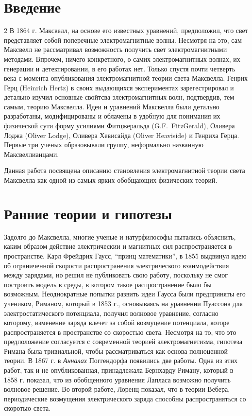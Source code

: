 \documentclass[12pt, oneside, a4paper]{article}
\begin{document}
\section*{Введение}2
В 1864 г. Максвелл, на основе его известных уравнений, предположил, что свет представляет собой поперечные электромагнитные волны. Несмотря на это, сам Максвелл не рассматривал возможность получить свет электромагнитными методами. Впрочем, ничего конкретного, о самих электромагнитных волнах, их генерации и детектировании, в его работах нет. Только спустя почти четверть века с момента опубликования электромагнитной теории света Максвелла, Генрих Герц (Heinrich Hertz) в своих выдающихся  экспериментах зарегестрировал и детально изучил основные свойтсва электромагнитных волн, подтвердив, тем самым, теорию Максвелла. Идеи и уравнений  Максвелла были детально разработаны, модифицированы и облачены в удобную для понимания их физической сути форму усилиями Фитцжеральда (G.F.~FitzGerald), Оливера Лоджа (Oliver Lodge), Оливера Хевисайда (Oliver Heaviside) и Генриха Герца. Первые три ученых образовывали группу, неформально названную Максвеллианцами. 

Данная работа посвящена описанию становления электромагнитной теории света Максвелла как одной из самых ярких обобщающих физических теорий.
\section*{Ранние теории и гипотезы}
Задолго до Максвелла, многие ученые и натурфилософы пытались объяснить, каким образом действие электрическии и магнитных  сил распространяется в пространстве. Карл Фрейдрих Гаусс, ``принц математики'', в 1855 выдвинул идею об ограниченной скорости распространения электрического взаимодействия между зарядами, но решил не публиковать свою работу, поскольку не смог построить модель в среды, в котором такое распространение было бы возможным. Неоднократные попытки развить идеи Гаусса были предприняты его учеником, Риманом, который в 1853 г., основываясь на уравнении Пуассона для электростатического потенциала, получил волновое уравнение, согласно которому, изменение заряда влечет за собой возмуцение потенциала, которе распространяется в пространстве со скоростью света. Несмотря на то, что это предположение согласуется с современной теорией электромагнетизма, гипотеза Римана была тривиальной, чтобы рассматриваться как основа полноценной теории. В 1867 г. в \emph{Анналах} Поггендорфа появились две работы. Одна из этих работ, так и не опубликованная, принадлежала Бернхарду Риману, который в 1858 г. показал, что из обобщенного уравнения Лапласа возможно получить волновое решение. Во второй работе, Лоренц показал, что в теории Вебера, периодические возмущения электрического заряда способны распространяться со скоротью света.
\end{document}

